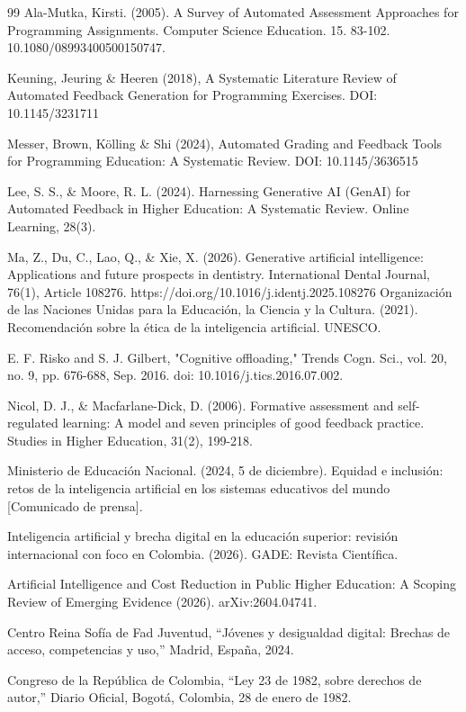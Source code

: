 \documentclass[letterpaper, 10 pt, conference]{ieeeconf}  %
\begin{document}
\begin{thebibliography}{99}
 Ala-Mutka, Kirsti. (2005). A Survey of Automated Assessment Approaches for Programming Assignments. Computer Science Education. 15. 83-102. 10.1080/08993400500150747.

 Keuning, Jeuring \& Heeren (2018), A Systematic Literature Review of Automated Feedback Generation for Programming Exercises. DOI: 10.1145/3231711

 Messer, Brown, Kölling \& Shi (2024), Automated Grading and Feedback Tools for Programming Education: A Systematic Review. DOI: 10.1145/3636515

 Lee, S. S., \& Moore, R. L. (2024). Harnessing Generative AI (GenAI) for Automated Feedback in Higher Education: A Systematic Review. Online Learning, 28(3). 

 Ma, Z., Du, C., Lao, Q., \& Xie, X. (2026). Generative artificial intelligence: Applications and future prospects in dentistry. International Dental Journal, 76(1), Article 108276. https://doi.org/10.1016/j.identj.2025.108276
 Organización de las Naciones Unidas para la Educación, la Ciencia y la Cultura. (2021). Recomendación sobre la ética de la inteligencia artificial. UNESCO. 

 E. F. Risko and S. J. Gilbert, "Cognitive offloading," Trends Cogn. Sci., vol. 20, no. 9, pp. 676-688, Sep. 2016. doi: 10.1016/j.tics.2016.07.002.

 Nicol, D. J., \& Macfarlane-Dick, D. (2006). Formative assessment and self-regulated learning: A model and seven principles of good feedback practice. Studies in Higher Education, 31(2), 199-218.

 Ministerio de Educación Nacional. (2024, 5 de diciembre). Equidad e inclusión: retos de la inteligencia artificial en los sistemas educativos del mundo [Comunicado de prensa].

 Inteligencia artificial y brecha digital en la educación superior: revisión internacional con foco en Colombia. (2026). GADE: Revista Científica.

 Artificial Intelligence and Cost Reduction in Public Higher Education: A Scoping Review of Emerging Evidence (2026). arXiv:2604.04741.


 Centro Reina Sofía de Fad Juventud, “Jóvenes y desigualdad digital: Brechas de acceso, competencias y uso,” Madrid, España, 2024.

 Congreso de la República de Colombia, “Ley 23 de 1982, sobre derechos de autor,” Diario Oficial, Bogotá, Colombia, 28 de enero de 1982.


\end{thebibliography}
\end{document}
